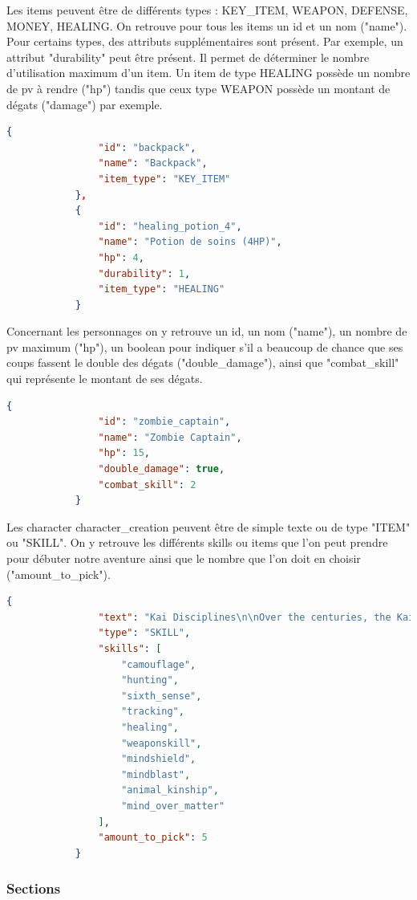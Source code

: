 			Les items peuvent être de différents types : KEY\_ITEM, WEAPON, DEFENSE, MONEY, HEALING. On retrouve pour tous les items un id et un nom ("name"). Pour certains types, des attributs supplémentaires sont présent. Par exemple, un attribut "durability" peut être présent. Il permet de déterminer le nombre d'utilisation maximum d'un item. Un item de type HEALING possède un nombre de pv à rendre ("hp") tandis que ceux type WEAPON possède un montant de dégats ("damage") par exemple.

			\begin{lstlisting}[gobble=12, language=json, caption=Exemple d'items]
			{
				"id": "backpack",
				"name": "Backpack",
				"item_type": "KEY_ITEM"
			},
			{
				"id": "healing_potion_4",
				"name": "Potion de soins (4HP)",
				"hp": 4,
				"durability": 1,
				"item_type": "HEALING"
			}
			\end{lstlisting}

			Concernant les personnages on y retrouve un id, un nom ("name"), un nombre de pv maximum ("hp"), un boolean pour indiquer s'il a beaucoup de chance que ses coups fassent le double des dégats ("double\_damage"), ainsi que "combat\_skill" qui représente le montant de ses dégats.

			\begin{lstlisting}[gobble=12, language=json, caption=Exemple de personnage]
			{
				"id": "zombie_captain",
				"name": "Zombie Captain",
				"hp": 15,
				"double_damage": true,
				"combat_skill": 2
			}
			\end{lstlisting}

			Les character character\_creation peuvent être de simple texte ou de type "ITEM" ou "SKILL". On y retrouve les différents skills ou items que l'on peut prendre pour débuter notre aventure ainsi que le nombre que l'on doit en choisir ("amount\_to\_pick").

			\begin{lstlisting}[gobble=12, language=json, caption=Exemple de character\_creation]
			{
				"text": "Kai Disciplines\n\nOver the centuries, the Kai monks have mastered the skills of the warrior. These skills are known as the Kai Disciplines, [...]",
				"type": "SKILL",
				"skills": [
					"camouflage",
					"hunting",
					"sixth_sense",
					"tracking",
					"healing",
					"weaponskill",
					"mindshield",
					"mindblast",
					"animal_kinship",
					"mind_over_matter"
				],
				"amount_to_pick": 5
			}
			\end{lstlisting}

		\subsubsection{Sections}

